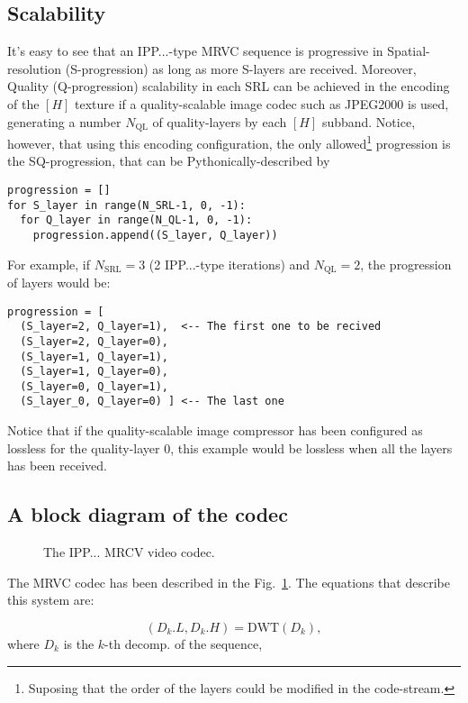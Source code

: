 \subsection{Scalability}
It's easy to see that an IPP...-type MRVC sequence is progressive in
Spatial-resolution (S-progression) as long as more S-layers are
received. Moreover, Quality (Q-progression) scalability in each SRL
can be achieved in the encoding of the $[H]$ texture if a
quality-scalable image codec such as JPEG2000 is used, generating a
number $N_{\text{QL}}$ of quality-layers by each $[H]$
subband. Notice, however, that using this encoding configuration, the
only allowed\footnote{Suposing that the order of the layers could be
modified in the code-stream.} progression is the SQ-progression, that
can be Pythonically-described by
\begin{verbatim}
progression = []
for S_layer in range(N_SRL-1, 0, -1):
  for Q_layer in range(N_QL-1, 0, -1):
    progression.append((S_layer, Q_layer))
\end{verbatim}

For example, if $N_{\text{SRL}}=3$ (2 IPP...-type iterations) and
$N_{\text{QL}}=2$, the progression of layers would be:
\begin{verbatim}
progression = [
  (S_layer=2, Q_layer=1),  <-- The first one to be recived
  (S_layer=2, Q_layer=0),
  (S_layer=1, Q_layer=1),
  (S_layer=1, Q_layer=0),
  (S_layer=0, Q_layer=1),
  (S_layer_0, Q_layer=0) ] <-- The last one
\end{verbatim}
Notice that if the quality-scalable image compressor has been
configured as lossless for the quality-layer 0, this example
would be lossless when all the layers has been received.

\subsection{A block diagram of the codec}
\begin{figure}
  \centering
  \caption{The IPP... MRCV video codec.}
  \label{fig:codec}
\end{figure}

The MRVC codec has been described in the Fig.~\ref{fig:codec}. The
equations that describe this system are:

\begin{equation}
  (D_k.L, D_k.H) = \text{DWT}(D_k),
  \tag{a}
\end{equation}
where $D_k$ is the $k$-th decomp. of the sequence,

